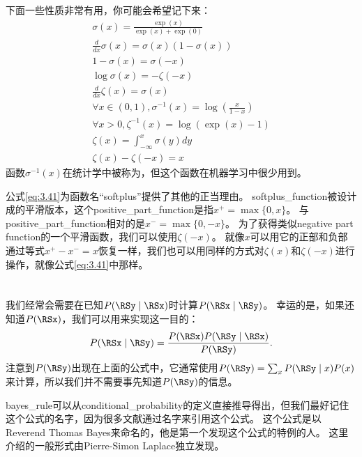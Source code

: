 
下面一些性质非常有用，你可能会希望记下来：
\begin{gather}
\sigma(x) = \frac{\exp(x)}{\exp(x)+\exp(0)}\\
\frac{d}{dx} \sigma(x) = \sigma(x)(1 - \sigma(x))\\
1-\sigma(x) = \sigma(-x)\\
\log \sigma(x) = -\zeta(-x)\\
\frac{d}{dx} \zeta(x) = \sigma(x)\\
\forall x \in (0, 1), \sigma^{-1}(x) = \log \left (  \frac{x}{1-x} \right)\\
\forall x>0, \zeta^{-1}(x) = \log(\exp(x) - 1)\\
\zeta(x) = \int_{-\infty}^x \sigma(y) dy\\
\zeta(x) - \zeta(-x) = x
\label{eq:3.41}
\end{gather}
函数$\sigma^{-1}(x)$在统计学中被称为，但这个函数在机器学习中很少用到。


公式\ref{eq:3.41}为函数名``softplus''提供了其他的正当理由。
\gls{softplus_function}被设计成的平滑版本，这个\gls{positive_part_function}是指$x^+ = \max \{ 0, x\}$。
与\gls{positive_part_function}相对的是$x^- = \max\{ 0, -x\}$。
为了获得类似\gls{negative part function}的一个平滑函数，我们可以使用$\zeta(-x)$。
就像$x$可以用它的正部和负部通过等式$x^+ - x^- = x$恢复一样，我们也可以用同样的方式对$\zeta(x)$和$\zeta(-x)$进行操作，就像公式\ref{eq:3.41}中那样。

\section{}
\label{sec:bayes_rule}

我们经常会需要在已知$P(\RSy \mid \RSx)$时计算$P(\RSx \mid \RSy)$。
幸运的是，如果还知道$P(\RSx)$，我们可以用来实现这一目的：
\begin{equation}
P(\RSx \mid \RSy) = \frac{P(\RSx) P(\RSy \mid \RSx)}{P(\RSy)}.
\end{equation}
注意到$P(\RSy)$出现在上面的公式中，它通常使用$P(\RSy) = \sum_x P(\RSy \mid x) P(x)$来计算，所以我们并不需要事先知道$P(\RSy)$的信息。

\gls{bayes_rule}可以从\gls{conditional_probability}的定义直接推导得出，但我们最好记住这个公式的名字，因为很多文献通过名字来引用这个公式。
这个公式是以Reverend Thomas Bayes来命名的，他是第一个发现这个公式的特例的人。
这里介绍的一般形式由Pierre-Simon Laplace独立发现。

